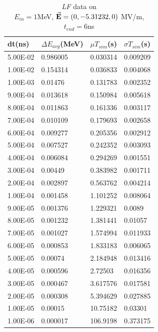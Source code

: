\documentclass[a4paper,oneside,12pt]{report}
\numberwithin{equation}{chapter}
\begin{document}
\begin{table}[H]
    \centering
    \begin{tabular}{|l|l|l|l|}
    \hline
    dt(ns)       & $\Delta E_{avg}$(MeV) & $\mu T_{sim}$(s)    & $\sigma T_{sim}$(s) \\\hline
    5.00E-02 & 0.986005     & 0.030314 & 0.009209 \\\hline
    1.00E-02 & 0.154314     & 0.036833 & 0.004068 \\\hline
    1.00E-03 & 0.01476      & 0.131783 & 0.002352 \\\hline
    9.00E-04 & 0.013618     & 0.150984 & 0.005618 \\\hline
    8.00E-04 & 0.011863     & 0.161336 & 0.003117 \\\hline
    7.00E-04 & 0.010109     & 0.179693 & 0.002658 \\\hline
    6.00E-04 & 0.009277     & 0.205356 & 0.002912 \\\hline
    5.00E-04 & 0.007527     & 0.242352 & 0.003093 \\\hline
    4.00E-04 & 0.006084     & 0.294269 & 0.001551 \\\hline
    3.00E-04 & 0.00449      & 0.383982 & 0.001711 \\\hline
    2.00E-04 & 0.002897     & 0.563762 & 0.004214 \\\hline
    1.00E-04 & 0.001458     & 1.101252 & 0.008064 \\\hline
    9.00E-05 & 0.001376     & 1.229321 & 0.0089   \\\hline
    8.00E-05 & 0.001232     & 1.381441 & 0.01057  \\\hline
    7.00E-05 & 0.001027     & 1.574994 & 0.011933 \\\hline
    6.00E-05 & 0.000853     & 1.833183 & 0.006065 \\\hline
    5.00E-05 & 0.00074      & 2.184948 & 0.013416 \\\hline
    4.00E-05 & 0.000596     & 2.72503  & 0.016356 \\\hline
    3.00E-05 & 0.000467     & 3.617576 & 0.017581 \\\hline
    2.00E-05 & 0.000308     & 5.394629 & 0.027885 \\\hline
    1.00E-05 & 0.00015      & 10.75182 & 0.03301  \\\hline
    1.00E-06 & 0.000017     & 106.9198 & 0.373175 \\\hline
    \end{tabular}
    \caption{\textit{LF} data on \\$E_{in}=1$MeV, $\vec{\textbf{E}}=(0, -5.31232, 0)$ MV/m, $t_{end}=6$ns}
    \label{tab:lf_statE90_table}
\end{table}
\end{document}

